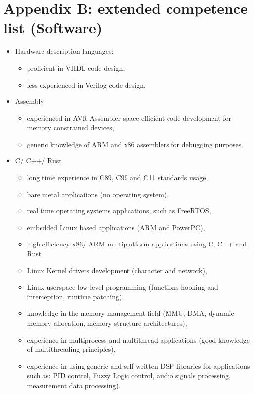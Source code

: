 \documentclass{tccv}
\begin{document}
\clearpage

\section{Appendix B: extended competence list (Software)}

\begin{itemize}
     \item Hardware description languages:
     \begin{itemize}
          \item proficient in VHDL code design,
          \item less experienced in Verilog code design. 
     \end{itemize}
     \item Assembly
          \begin{itemize}
               \item experienced in AVR Assembler space efficient code development for memory constrained devices,
               \item generic knowledge of ARM and x86 assemblers for debugging purposes.
          \end{itemize}
     \item C/ C++/ Rust
          \begin{itemize}
               \item long time experience in C89, C99 and C11 standards usage,
               \item bare metal applications (no operating system),
               \item real time operating systems applications, such as FreeRTOS,
               \item embedded Linux based applications (ARM and PowerPC),
               \item high efficiency x86/ ARM multiplatform applications using C, C++ and Rust,
               \item Linux Kernel drivers development (character and network),
               \item Linux userspace low level programming (functions hooking and interception, runtime patching),
               \item knowledge in the memory management field (MMU, DMA, dynamic memory allocation, memory structure architectures),
               \item experience in multiprocess and multithread applications (good knowledge of multithreading principles),
               \item experience in using generic and self written DSP libraries for applications such as: PID control, Fuzzy Logic control, audio signals processing, measurement data processing).

\end{itemize}
\end{itemize}
\end{document}
